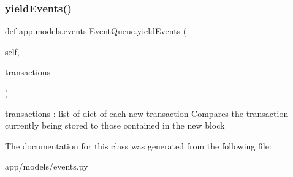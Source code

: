 \subsubsection{\texorpdfstring{yield\+Events()}{yieldEvents()}}
{\footnotesize\ttfamily def app.\+models.\+events.\+Event\+Queue.\+yield\+Events (\begin{DoxyParamCaption}\item[{}]{self,  }\item[{}]{transactions }\end{DoxyParamCaption})}

\begin{DoxyVerb}transactions : list of dict of each new transaction
Compares the transaction currently being stored to those contained in the new block
\end{DoxyVerb}
 

The documentation for this class was generated from the following file\+:\begin{DoxyCompactItemize}
\item 
app/models/events.\+py\end{DoxyCompactItemize}
